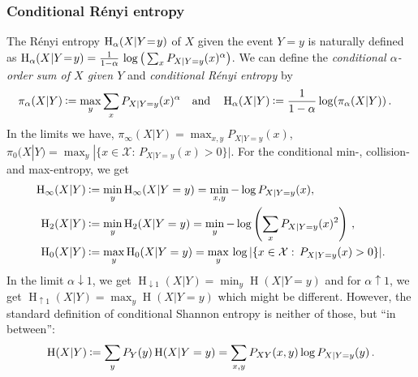 \documentclass[final,11pt,a4paper]{report}
\newcommand*{\assign}{\ensuremath{\kern.5ex\raisebox{.1ex}{\mbox{\rm:}}\kern -.3em =}}
\def\={\hspace{-0.5ex}=\hspace{-0.4ex}}
\newcommand*{\cX}{\mathcal{X}}
\newcommand*{\Set}[2]{\{#1:\,#2\}}     %
\renewcommand*{\H}{\operatorname{H}}   %
\begin{document}
\subsubsection{Conditional R{\'e}nyi entropy} \label{sec:conditionalrenyientropy}
The R{\'e}nyi entropy $\H_{\alpha}(X|Y\=y)$ of $X$ given the event
$Y=y$ is naturally defined as $\H_{\alpha}(X|Y\=y) =
\frac{1}{1-\alpha} \, \log\big(\sum_x P_{X|Y=y}(x)^{\alpha}\big)$. We
can define the \emph{conditional $\alpha$-order sum of $X$ given $Y$}
and \emph{conditional R{\'e}nyi entropy} by
\begin{align*}
\pi_\alpha(X|Y) &\assign \max_y \sum_{x} P_{X|Y=y}(x)^{\alpha} \quad\mbox{and}\quad  \H_\alpha(X|Y) \assign \frac{1}{1-\alpha} \log(\pi_\alpha(X|Y)) \, . 
\end{align*}
In the limits we have, $\pi_\infty(X|Y)=\max_{x,y} P_{X|Y=y}(x)$,
$\pi_0(X|Y) = \max_y |\Set{x \in \cX}{P_{X|Y=y}(x)>0}|$. For the
conditional min-, collision- and max-entropy, we get
\begin{align*}
\H_{\infty}(X|Y) &\assign \min_y \H_{\infty}(X|Y=y) = \min_{x,y} -\log
P_{X|Y=y}(x), \\
\H_2(X|Y) &\assign \min_y \H_2(X|Y=y) = \min_y -\log \left( \sum_x
  P_{X|Y=y}(x)^2 \right) \, ,\\
\H_0(X|Y) &\assign \max_y \H_0(X|Y=y) = \max_y \, \log | \Set{x \in
  \cX}{P_{X|Y=y}(x)>0} | .
\end{align*}
In the limit $\alpha \downarrow 1$, we get $\H_{\downarrow 1}(X|Y) =
\min_y \H(X|Y=y)$ and for $\alpha \uparrow 1$, we get $\H_{\uparrow
  1}(X|Y) = \max_y \H(X|Y=y)$ which might be different. However, the
standard definition of conditional Shannon entropy is neither of
those, but ``in between'':
\[
\H(X|Y) \assign \sum_y P_Y(y) \H(X|Y=y) = \sum_{x,y} P_{XY}(x,y) \log
P_{X|Y=y}(y) \, .
\]
\end{document}
